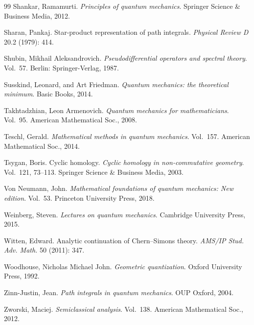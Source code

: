 \begin{thebibliography}{99}
Shankar, Ramamurti.
\emph{Principles of quantum mechanics}. Springer Science \& Business Media, 2012.

Sharan, Pankaj.
Star-product representation of path integrals.
\emph{Physical Review D} 20.2 (1979): 414.

Shubin, Mikhail Aleksandrovich.
\emph{Pseudodifferential operators and spectral theory}. Vol.~57.
Berlin: Springer-Verlag, 1987.

Susskind, Leonard, and Art Friedman.
\emph{Quantum mechanics: the theoretical minimum}. Basic Books, 2014.

Takhtadzhian, Leon Armenovich.
\emph{Quantum mechanics for mathematicians}. Vol.~95.
American Mathematical Soc., 2008.

Teschl, Gerald.
\emph{Mathematical methods in quantum mechanics}. Vol.~157.
American Mathematical Soc., 2014.

Tsygan, Boris.
Cyclic homology.
\emph{Cyclic homology in non-commutative geometry}. Vol.~121, 73--113.
Springer Science \& Business Media, 2003.

Von Neumann, John.
\emph{Mathematical foundations of quantum mechanics: New edition}. Vol.~53.
Princeton University Press, 2018.

Weinberg, Steven.
\emph{Lectures on quantum mechanics}. Cambridge University Press, 2015.

Witten, Edward.
Analytic continuation of Chern--Simons theory.
\emph{AMS/IP Stud. Adv. Math.} 50 (2011): 347.

Woodhouse, Nicholas Michael John.
\emph{Geometric quantization}. Oxford University Press, 1992.

Zinn-Justin, Jean.
\emph{Path integrals in quantum mechanics}. OUP Oxford, 2004.

Zworski, Maciej.
\emph{Semiclassical analysis}. Vol.~138. American Mathematical Soc., 2012.

\end{thebibliography}

